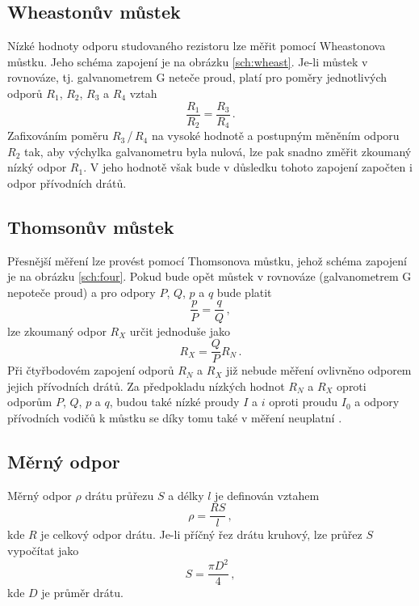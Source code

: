 \documentclass{../concepts/prepareprotokol} %
\begin{document}
\subsection{Wheastonův můstek}

Nízké hodnoty odporu studovaného rezistoru lze měřit pomocí Wheastonova můstku. Jeho schéma zapojení je na obrázku \ref{sch:wheast}. Je-li můstek v rovnováze, tj. galvanometrem G neteče proud, platí pro poměry jednotlivých odporů $R_1$, $R_2$, $R_3$ a $R_4$ vztah \cite{studijni}
\begin{equation}
    \frac{R_1}{R_2} = \frac{R_3}{R_4} \, .
\end{equation}
Zafixováním poměru $R_3$\,/\,$R_4$ na vysoké hodnotě a postupným měněním odporu $R_2$ tak, aby výchylka galvanometru byla nulová, lze pak snadno změřit zkoumaný nízký odpor $R_1$. V jeho hodnotě však bude v důsledku tohoto zapojení započten i odpor přívodních drátů.

\subsection{Thomsonův můstek}

Přesnější měření lze provést pomocí Thomsonova můstku, jehož schéma zapojení je na obrázku \ref{sch:four}. Pokud bude opět můstek v rovnováze (galvanometrem G nepoteče proud) a pro odpory $P$, $Q$, $p$ a $q$ bude platit
\begin{equation}
    \frac{p}{P} = \frac{q}{Q} \, ,
\end{equation}
lze zkoumaný odpor $R_X$ určit jednoduše jako \cite{studijni}
\begin{equation}
    R_X = \frac{Q}{P} R_N \, .
\end{equation}
Při čtyřbodovém zapojení odporů $R_N$ a $R_X$ již nebude měření ovlivněno odporem jejich přívodních drátů. Za předpokladu nízkých hodnot $R_N$ a $R_X$ oproti odporům $P$, $Q$, $p$ a $q$, budou také nízké proudy $I$ a $i$ oproti proudu $I_0$ a odpory přívodních vodičů k můstku se díky tomu také v měření neuplatní \cite{studijni}.

\subsection{Měrný odpor}

Měrný odpor $\rho$ drátu průřezu $S$ a délky $l$ je definován vztahem \cite{studijni}
\begin{equation}
    \rho = \frac{R S}{l} \, ,
\end{equation}
kde $R$ je celkový odpor drátu. Je-li příčný řez drátu kruhový, lze průřez $S$ vypočítat jako
\begin{equation}
    S = \frac{\pi D^2}{4} \, ,
\end{equation}
kde $D$ je průměr drátu.
\end{document}
